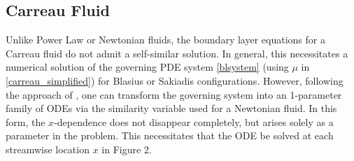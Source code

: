 \documentclass[lineno]{JFM-FLM_Au}
\begin{document}
\subsection{Carreau Fluid}

\hspace{\parindent} Unlike Power Law or Newtonian fluids, the boundary layer equations for a Carreau fluid do not admit a self-similar solution. In general, this necessitates a numerical solution of the governing PDE system \eqref{blsystem} (using $\mu$ in \eqref{carreau_simplified}) for Blasius or Sakiadis configurations. However, following the approach of \citet{Griffiths}, one can transform the governing system into an 1-parameter family of ODEs via the similarity variable used for a Newtonian fluid.  In this form, the $x$-dependence does not disappear completely, but arises solely as a parameter in the problem.  This necessitates that the ODE be solved at each streamwise location $x$ in Figure 2.
\end{document}
